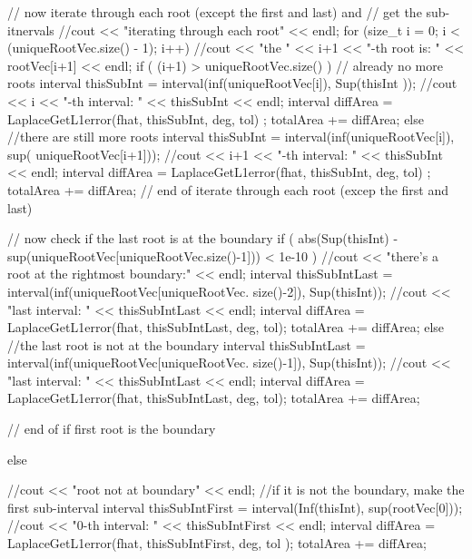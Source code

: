 \begin{DoxyCode}
{{{{{          // now iterate through each root (except the first and last) and 
          // get the sub-itnervals
          //cout << "iterating through each root" << endl;
          for (size_t i = 0; i < (uniqueRootVec.size() - 1); i++) {
            //cout << "the " << i+1 << "-th root is: " << rootVec[i+1] << endl;
            if ( (i+1) > uniqueRootVec.size() ) { // already no more roots
              interval thisSubInt = interval(inf(uniqueRootVec[i]), Sup(thisInt
      ));
              //cout << i << "-th interval: " << thisSubInt << endl;
              interval diffArea = LaplaceGetL1error(fhat, thisSubInt, deg, tol)
      ;
              totalArea += diffArea;
            }
            else { //there are still more roots
              interval thisSubInt = interval(inf(uniqueRootVec[i]), sup(
      uniqueRootVec[i+1]));
              //cout << i+1 << "-th interval: " << thisSubInt << endl;
              interval diffArea = LaplaceGetL1error(fhat, thisSubInt, deg, tol)
      ;
              totalArea += diffArea;
            }
          } // end of iterate through each root (excep the first and last)
          
          // now check if the last root is at the boundary
          if ( abs(Sup(thisInt) - sup(uniqueRootVec[uniqueRootVec.size()-1])) <
       1e-10 ) {
            //cout << "there's a root at the rightmost boundary:" << endl;
            interval thisSubIntLast = interval(inf(uniqueRootVec[uniqueRootVec.
      size()-2]), Sup(thisInt));
            //cout << "last interval: " << thisSubIntLast << endl; 
            interval diffArea = LaplaceGetL1error(fhat, thisSubIntLast, deg, 
      tol);
            totalArea += diffArea;
          }
          else { //the last root is not at the boundary
            interval thisSubIntLast = interval(inf(uniqueRootVec[uniqueRootVec.
      size()-1]), Sup(thisInt));
            //cout << "last interval: " << thisSubIntLast << endl; 
            interval diffArea = LaplaceGetL1error(fhat, thisSubIntLast, deg, 
      tol);
            totalArea += diffArea;
          } 
        } // end of if first root is the boundary
        
        else {
          //cout << "root not at boundary" << endl;
          //if it is not the boundary, make the first sub-interval
          interval thisSubIntFirst = interval(Inf(thisInt), sup(rootVec[0]));
          //cout << "0-th interval: " << thisSubIntFirst << endl; 
          interval diffArea = LaplaceGetL1error(fhat, thisSubIntFirst, deg, tol
      );
          totalArea += diffArea;
          
}}}}}
\end{DoxyCode}
